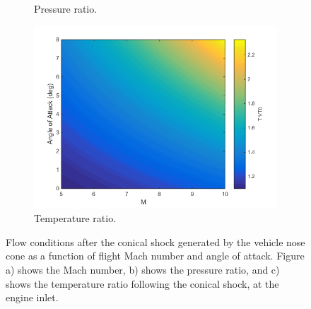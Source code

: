 \begin{figure}[ht]
\begin{subfigure}{.5\textwidth}
		\caption{Pressure ratio.}
		\label{fig:ConicalP}
	\end{subfigure}
	\begin{subfigure}{.5\textwidth}
		\centering
		\includegraphics[width=0.99\linewidth]{figures/3_vehicle_design/ConicalT}
		\caption{Temperature ratio.}
		\label{fig:ConicalT}
	\end{subfigure}
	\caption{Flow conditions after the conical shock generated by the vehicle nose cone as a function of flight Mach number and angle of attack. Figure a) shows the Mach number, b) shows the pressure ratio, and c) shows the temperature ratio following the conical shock, at the engine inlet.}
	\label{fig:ConicalShock}
\end{figure}


